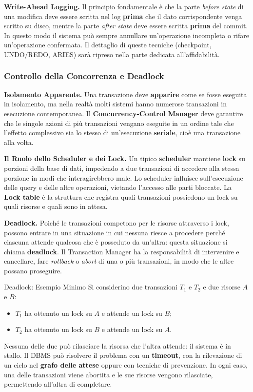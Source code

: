 \documentclass[12pt]{extarticle}
\begin{document}
\medskip
\noindent \textbf{Write-Ahead Logging.} Il principio fondamentale è che la parte \textit{before state} di una modifica deve essere scritta nel log \textbf{prima} che il dato corrispondente venga scritto su disco, mentre la parte \textit{after state} deve essere scritta \textbf{prima} del commit. In questo modo il sistema può sempre annullare un'operazione incompleta o rifare un'operazione confermata. Il dettaglio di queste tecniche (checkpoint, UNDO/REDO, ARIES) sarà ripreso nella parte dedicata all'affidabilità.

\subsubsection{Controllo della Concorrenza e Deadlock}

\noindent \textbf{Isolamento Apparente.} Una transazione deve \textbf{apparire} come se fosse eseguita in isolamento, ma nella realtà molti sistemi hanno numerose transazioni in esecuzione contemporanea. Il \textbf{Concurrency-Control Manager} deve garantire che le singole azioni di più transazioni vengano eseguite in un ordine tale che l'effetto complessivo sia lo stesso di un'esecuzione \textbf{seriale}, cioè una transazione alla volta.

\medskip
\noindent \textbf{Il Ruolo dello Scheduler e dei Lock.} Un tipico \textbf{scheduler} mantiene \textbf{lock} su porzioni della base di dati, impedendo a due transazioni di accedere alla stessa porzione in modi che interagirebbero male. Lo scheduler influisce sull'esecuzione delle query e delle altre operazioni, vietando l'accesso alle parti bloccate. La \textbf{Lock table} è la struttura che registra quali transazioni possiedono un lock su quali risorse e quali sono in attesa.

\medskip
\noindent \textbf{Deadlock.} Poiché le transazioni competono per le risorse attraverso i lock, possono entrare in una situazione in cui nessuna riesce a procedere perché ciascuna attende qualcosa che è posseduto da un'altra: questa situazione si chiama \textbf{deadlock}. Il Transaction Manager ha la responsabilità di intervenire e cancellare, fare \textit{rollback} o \textit{abort} di una o più transazioni, in modo che le altre possano proseguire.

\begin{cbox}{Deadlock: Esempio Minimo}
\noindent Si considerino due transazioni $T_1$ e $T_2$ e due risorse $A$ e $B$:
\begin{itemize}
    \item $T_1$ ha ottenuto un lock su $A$ e attende un lock su $B$;
    \item $T_2$ ha ottenuto un lock su $B$ e attende un lock su $A$.
\end{itemize}
\medskip
\noindent Nessuna delle due può rilasciare la risorsa che l'altra attende: il sistema è in stallo. Il DBMS può risolvere il problema con un \textbf{timeout}, con la rilevazione di un ciclo nel \textbf{grafo delle attese} oppure con tecniche di prevenzione. In ogni caso, una delle transazioni viene abortita e le sue risorse vengono rilasciate, permettendo all'altra di completare.
\end{cbox}
\end{document}
